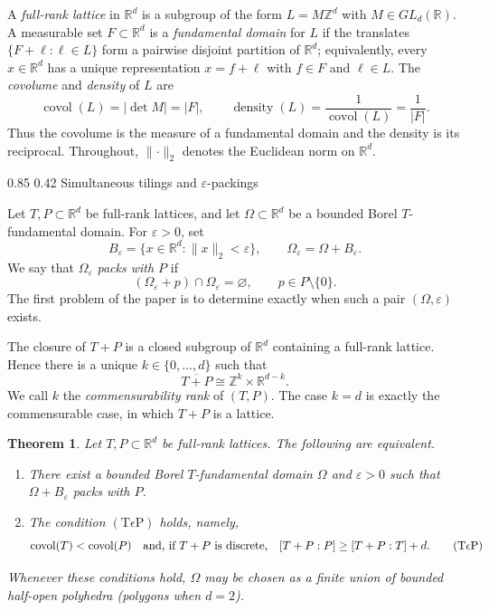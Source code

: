 \documentclass[11pt,reqno]{amsart}
\makeatletter
\numberwithin{equation}{section}
\renewcommand\subsection{\@startsection{subsection}{2}{\z@}%
  {0.85\baselineskip \@plus 0.25\baselineskip \@minus 0.10\baselineskip}%
  {0.42\baselineskip}%
  {\normalfont\bfseries}}
\newtheorem{theorem}{Theorem}[section]
\theoremstyle{definition}
\theoremstyle{remark}
\newcommand{\R}{\mathbb R}
\newcommand{\Z}{\mathbb Z}
\newcommand{\eps}{\varepsilon}
\newcommand{\covol}{\operatorname{covol}}
\newcommand{\norm}[1]{\lVert #1\rVert}
\newcommand{\TeP}{\ensuremath{(\mathrm{T}\epsilon\mathrm{P})}\xspace}
\makeatother
\begin{document}
\medskip

A \emph{full-rank lattice} in $\R^d$ is a subgroup of the form
$L=M\Z^d$ with $M\in GL_d(\R)$.  A measurable set $F\subset\R^d$ is a
\emph{fundamental domain} for $L$ if the translates
$\{F+\ell:\ell\in L\}$ form a pairwise disjoint partition of $\R^d$;
equivalently, every $x\in\R^d$ has a unique representation $x=f+\ell$ with
$f\in F$ and $\ell\in L$.  The \emph{covolume} and \emph{density} of $L$ are
\[
 \covol(L)=|\det M|=|F|,
 \qquad
 \operatorname{density}(L)=\frac{1}{\covol(L)}=\frac{1}{|F|}.
\]
Thus the covolume is the measure of a fundamental domain and the density is
its reciprocal.  Throughout, $\norm{\cdot}_2$ denotes the Euclidean norm on
$\R^d$.


\subsection{Simultaneous tilings and $\varepsilon$-packings}
\label{subsec:intro-tiling-packing}

Let $T,P\subset\R^d$ be full-rank lattices, and let $\Omega\subset\R^d$ be a
bounded Borel $T$-fundamental domain.  For $\eps>0$, set
\[
 B_\eps=\{x\in\R^d:\norm{x}_2<\eps\},
 \qquad \Omega_\eps=\Omega+B_\eps.
\]
We say that $\Omega_\eps$ \emph{packs with $P$} if
\[
 (\Omega_\eps+p)\cap\Omega_\eps=\varnothing
 ,\qquad p\in P\setminus\{0\}.
\]
The first problem of the paper is to determine exactly when such a pair
$(\Omega,\eps)$ exists.

The closure of $T+P$ is a closed subgroup of $\R^d$ containing a full-rank
lattice.  Hence there is a unique $k\in\{0,\ldots,d\}$ such that
\[
 \overline{T+P}\cong \Z^k\times\R^{d-k}.
\]
We call $k$ the \emph{commensurability rank} of $(T,P)$.  The case $k=d$ is
exactly the commensurable case, in which $T+P$ is a lattice.

\begin{theorem}\label{thm:main-geometric}
Let $T,P\subset\R^d$ be full-rank lattices.  The following are equivalent.
\begin{enumerate}[label=(\alph*)]
\item There exist a bounded Borel $T$-fundamental domain $\Omega$ and
$\eps>0$ such that $\Omega+B_\eps$ packs with $P$.
\item The condition \TeP holds, namely,
\begin{equation}
 \covol(T)<\covol(P)
 \quad\text{and, if $T+P$ is discrete,}\quad
 [T+P:P]\ge [T+P:T]+d.
 \tag{\ensuremath{\mathrm{T}\epsilon\mathrm{P}}}\label{eq:TeP}
\end{equation}
\end{enumerate}
Whenever these conditions hold, $\Omega$ may be chosen as a finite union of
bounded half-open polyhedra (polygons when $d=2$).
\end{theorem}
\end{document}
